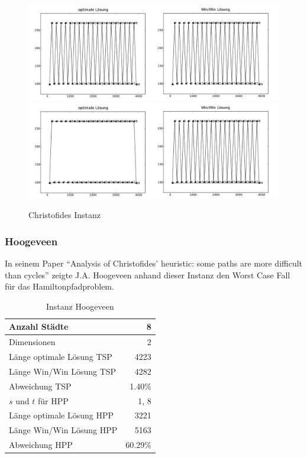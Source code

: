 \documentclass[11pt,a4paper]{article}
\begin{document}
\begin{figure}[H]
        \centering
        \includegraphics[width=16cm]{gfx/christofides_hpp_comparison}
        \includegraphics[width=16cm]{gfx/christofides_tsp_comparison}
        \caption{Christofides Instanz}
        \label{img:christofides_comparison}
\end{figure}

\subsubsection{Hoogeveen}
In seinem Paper "`Analysis of Christofides' heuristic: some paths are more difficult than cycles"'\cite{hoogeveen91} zeigte J.A. Hoogeveen anhand dieser Instanz den Worst Case Fall für das Hamiltonpfadproblem.

\begin{table}[H]
        \centering
        \begin{tabular}{| l | r |}
            \hline
                Anzahl Städte               & 8             \\ \hline
                Dimensionen                 & 2             \\ \hline
                Länge optimale Lösung TSP   & 4223          \\ \hline
                Länge Win/Win Lösung  TSP   & 4282          \\ \hline
                Abweichung TSP              & 1.40\%        \\ \hline
                $s$ und $t$ für HPP         & 1, 8          \\ \hline
                Länge optimale Lösung HPP   & 3221          \\ \hline
                Länge Win/Win Lösung  HPP   & 5163          \\ \hline
                Abweichung HPP              & 60.29\%       \\ \hline
        \end{tabular}
        \caption{Instanz Hoogeveen}
        \label{tab:instanz_hoogeveen}
\end{table}
\end{document}
